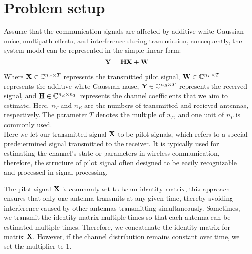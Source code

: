 \documentclass[journal,12pt,onecolumn,draftclsnofoot]{IEEEtran}
\begin{document}
    \section{Problem setup}
    
        Assume that the communication signals are affected by additive white Gaussian noise, multipath effects, and interference during transmission, consequently,
        the system model can be represented in the simple linear form:
        \begin{equation} \label{eq:sysModel}
            {\bf Y} = {\bf H}{\bf X} + {\bf W}
        \end{equation}

        Where ${\bf X} \in \mathbb{C}^{n_T \times T}$ represents the transmitted pilot signal, ${\bf W} \in \mathbb{C}^{n_R \times T}$ represents the additive white Gaussian noise, 
        ${\bf Y} \in \mathbb{C}^{n_R \times T}$ represents the received signal, and ${\bf H} \in \mathbb{C}^{n_R \times n_T}$ represents the channel coefficients
        that we aim to estimate. Here, $n_T$ and $n_R$ are the numbers of transmitted and recieved antennas, respectively. The parameter $T$ denotes the multiple of $n_T$, 
        and one unit of $n_T$ is commonly used.\\

        Here we let our transmitted signal ${\bf X}$ to be pilot signals, which refers to a special predetermined signal transmitted to the receiver. 
        It is typically used for estimating the channel's state or parameters in wireless communication, therefore,
        the structure of pilot signal often designed to be easily recognizable and processed in signal processing. 

        The pilot signal ${\bf X}$ is commonly set to be an identity matrix, this approach ensures that only one antenna transmits at any given time, thereby avoiding 
        interference caused by other 
        antennas transmitting simultaneously. Sometimes, we transmit the identity matrix multiple times so that each antenna can be estimated multiple times. Therefore, 
        we concatenate the identity matrix for matrix ${\bf X}$. However, if the channel distribution remains constant over time, we set the multiplier to 1.\\
\end{document}
